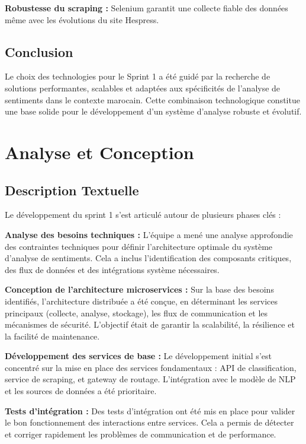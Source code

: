 \textbf{Robustesse du scraping :} Selenium garantit une collecte fiable des données même avec les évolutions du site Hespress.

\subsection{Conclusion}

Le choix des technologies pour le Sprint 1 a été guidé par la recherche de solutions performantes, scalables et adaptées aux spécificités de l'analyse de sentiments dans le contexte marocain. Cette combinaison technologique constitue une base solide pour le développement d'un système d'analyse robuste et évolutif.

\section{Analyse et Conception}

\subsection{Description Textuelle}

Le développement du sprint 1 s'est articulé autour de plusieurs phases clés :

\textbf{Analyse des besoins techniques :} L'équipe a mené une analyse approfondie des contraintes techniques pour définir l'architecture optimale du système d'analyse de sentiments. Cela a inclus l'identification des composants critiques, des flux de données et des intégrations système nécessaires.

\textbf{Conception de l'architecture microservices :} Sur la base des besoins identifiés, l'architecture distribuée a été conçue, en déterminant les services principaux (collecte, analyse, stockage), les flux de communication et les mécanismes de sécurité. L'objectif était de garantir la scalabilité, la résilience et la facilité de maintenance.

\textbf{Développement des services de base :} Le développement initial s'est concentré sur la mise en place des services fondamentaux : API de classification, service de scraping, et gateway de routage. L'intégration avec le modèle de NLP et les sources de données a été prioritaire.

\textbf{Tests d'intégration :} Des tests d'intégration ont été mis en place pour valider le bon fonctionnement des interactions entre services. Cela a permis de détecter et corriger rapidement les problèmes de communication et de performance.

